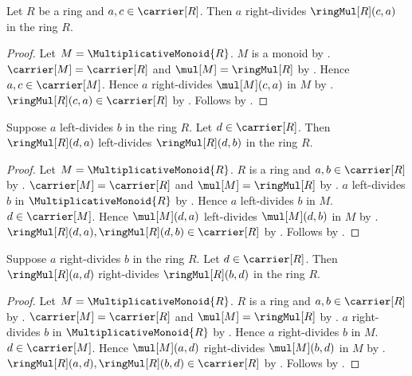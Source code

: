 \begin{proposition}\label{right_ring_divides_product}
    Let $R$ be a ring and $a,c\in\carrier[R]$.
    Then $a$ right-divides $\ringMul[R](c,a)$ in the ring $R$.
\end{proposition}
\begin{proof}
    Let $M=\MultiplicativeMonoid{R}$.
    $M$ is a monoid by .
    $\carrier[M]=\carrier[R]$ and $\mul[M]=\ringMul[R]$ by
        .
    Hence $a,c\in\carrier[M]$.
    Hence $a$ right-divides $\mul[M](c,a)$ in $M$ by
        .
    $\ringMul[R](c,a)\in\carrier[R]$ by .
    Follows by .
\end{proof}

\begin{theorem}\label{left_ring_divisibility_mul_left}
    Suppose $a$ left-divides $b$ in the ring $R$.
    Let $d\in\carrier[R]$.
    Then $\ringMul[R](d,a)$ left-divides $\ringMul[R](d,b)$
        in the ring $R$.
\end{theorem}
\begin{proof}
    Let $M=\MultiplicativeMonoid{R}$.
    $R$ is a ring and $a,b\in\carrier[R]$ by
        .
    $\carrier[M]=\carrier[R]$ and $\mul[M]=\ringMul[R]$ by
        .
    $a$ left-divides $b$ in $\MultiplicativeMonoid{R}$ by
        .
    Hence $a$ left-divides $b$ in $M$.
    $d\in\carrier[M]$.
    Hence $\mul[M](d,a)$ left-divides $\mul[M](d,b)$ in $M$ by
        .
    $\ringMul[R](d,a),\ringMul[R](d,b)\in\carrier[R]$ by
        .
    Follows by .
\end{proof}

\begin{theorem}\label{right_ring_divisibility_mul_right}
    Suppose $a$ right-divides $b$ in the ring $R$.
    Let $d\in\carrier[R]$.
    Then $\ringMul[R](a,d)$ right-divides $\ringMul[R](b,d)$
        in the ring $R$.
\end{theorem}
\begin{proof}
    Let $M=\MultiplicativeMonoid{R}$.
    $R$ is a ring and $a,b\in\carrier[R]$ by
        .
    $\carrier[M]=\carrier[R]$ and $\mul[M]=\ringMul[R]$ by
        .
    $a$ right-divides $b$ in $\MultiplicativeMonoid{R}$ by
        .
    Hence $a$ right-divides $b$ in $M$.
    $d\in\carrier[M]$.
    Hence $\mul[M](a,d)$ right-divides $\mul[M](b,d)$ in $M$ by
        .
    $\ringMul[R](a,d),\ringMul[R](b,d)\in\carrier[R]$ by
        .
    Follows by .
\end{proof}

